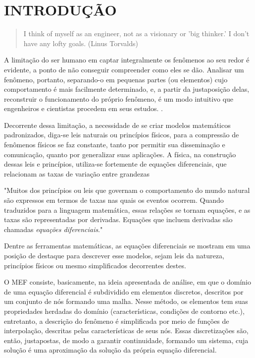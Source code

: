 

\chapter{INTRODUÇÃO}

\begin{quote}
    I think of myself as an engineer, not as a visionary or 'big thinker.' I don't have any lofty goals.
    (Linus Torvalds)  
\end{quote}

A limitação do ser humano em captar integralmente os fenômenos ao seu redor é evidente, a ponto de não conseguir compreender como eles se dão. Analisar um fenômeno, portanto, separando-o em pequenas partes (ou elementos) cujo comportamento é mais facilmente determinado, e, a partir da justaposição delas, reconstruir o funcionamento do próprio fenômeno, é um modo intuitivo que engenheiros e cientistas procedem em seus estudos. \cite[p. 2]{Zin}.

Decorrente dessa limitação, a necessidade de se criar modelos matemáticos padronizados, diga-se leis naturais ou princípios físicos, para a compressão de fenômenos físicos se faz constante, tanto por permitir sua disseminação e comunicação, quanto por generalizar suas aplicações. A física, na construção dessas leis e princípios, utiliza-se fortemente de equações diferenciais, que relacionam as taxas de variação entre grandezas

"Muitos dos princípios ou leis que governam o comportamento do mundo natural são expressos em termos de taxas nas quais os eventos ocorrem. Quando traduzidos para a linguagem matemática, essas relações se tornam equações, e as taxas são representadas por derivadas. Equações que incluem derivadas são chamadas \emph{equações diferenciais}." \cite[pág. 1]{diprima} 

Dentre as ferramentas matemáticas, as equações diferenciais se mostram em uma posição de destaque para descrever esse modelos, sejam leis da natureza, princípios físicos ou mesmo simplificados decorrentes destes. 

O MEF consiste, basicamente, na ideia apresentada de análise, em que o domínio de uma equação diferencial é subdividido em elementos discretos, descritos por um conjunto de nós formando uma malha. Nesse método, os elementos tem suas propriedades herdadas do domínio (características, condições de contorno etc.), entretanto, a descrição do fenômeno é simplificada por meio de funções de interpolação, descritas pelas características de seus nós. Essas discretizações são, então, justapostas, de modo a garantir continuidade, formando um sistema, cuja solução é uma aproximação da solução da própria equação diferencial. 

